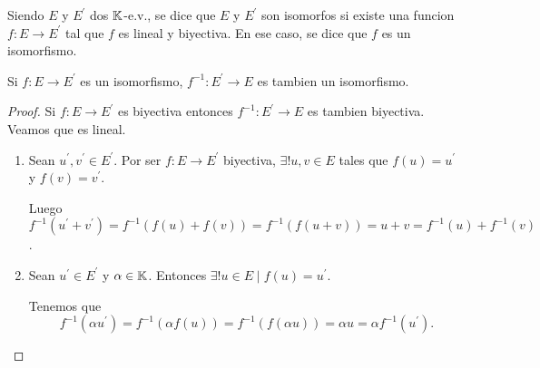 \begin{definition}
	Siendo \(E \) y \(E^\prime  \) dos \(\mathbb{K} \)-e.v., se dice que \(E \) y \(E^\prime  \) son isomorfos si existe una funcion \(f \colon E \to E^\prime \) tal que \(f \) es lineal y biyectiva. En ese caso, se dice que \( f \) es un isomorfismo.
\end{definition}
\begin{proposition}
	Si \(f \colon E \to E^\prime  \) es un isomorfismo, \(f^{-1} \colon E^\prime \to E \) es tambien un isomorfismo.
\end{proposition}
\begin{proof}
	Si \(f\colon E \to E^\prime  \) es biyectiva entonces \(f^{-1} \colon E^\prime \to E \) es tambien biyectiva. Veamos que es lineal.

	\begin{enumerate}
		\item Sean \(u^\prime, v^\prime \in E^\prime \). Por ser \(f \colon E \to E^\prime  \) biyectiva, \(\exists ! u,v \in E \) tales que \(f(u) = u^\prime \) y \(f(v) = v^\prime \).

		      Luego \(f^{-1} (u^\prime +v^\prime ) = f^{-1} (f(u) + f(v)) = f^{-1} (f(u + v)) =  u + v = f^{-1} (u) + f^{-1} (v)\).
		\item Sean \(u^\prime \in E^\prime  \) y \(\alpha \in \mathbb{K} \). Entonces \(\exists ! u \in E \mid f(u) = u^\prime  \).

		      Tenemos que
		      \[
			      f^{-1}(\alpha u^\prime ) = f^{-1} (\alpha f(u)) = f^{-1} (f(\alpha u)) = \alpha u = \alpha f^{-1} (u^\prime ).
		      \]
	\end{enumerate}
\end{proof}

